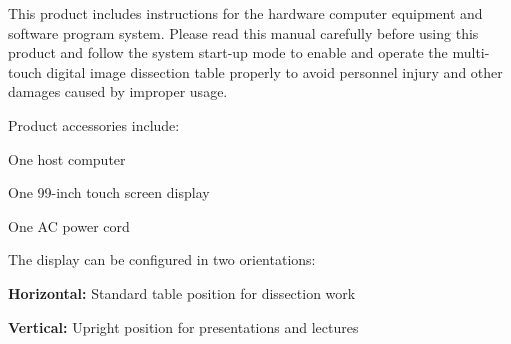 \documentclass[11pt,a4paper]{article}
\begin{document}



\tbkTableOfContents[title={Contents},depth=4]




This product includes instructions for the hardware computer equipment and software
program system. Please read this manual carefully before using this product and follow
the system start-up mode to enable and operate the multi-touch digital image dissection
table properly to avoid personnel injury and other damages caused by improper usage.



Product accessories include:

\begin{tbkList}[bullet=check]
  \item One host computer
  \item One 99-inch touch screen display
  \item One AC power cord
\end{tbkList}

The display can be configured in two orientations:

\begin{tbkList}[bullet=arrow]
  \item \textbf{Horizontal:} Standard table position for dissection work
  \item \textbf{Vertical:} Upright position for presentations and lectures
\end{tbkList}
\end{document}

